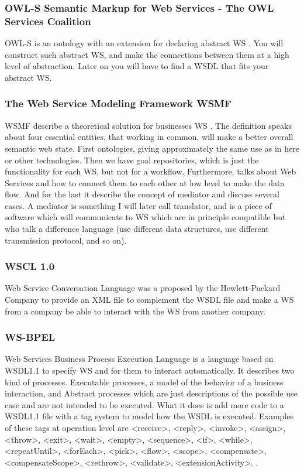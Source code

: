 \documentclass[a4paper,10pt]{article}
\begin{document}
    \subsubsection{OWL-S Semantic Markup for Web Services - The OWL Services Coalition}

    OWL-S is an ontology with an extension for declaring abstract WS \cite{owls} \cite{icec}. You will construct such abstract WS, and make the connections between them at a high level of abstraction. Later on you will have to find a WSDL that fits your abstract WS.

    \subsubsection{The Web Service Modeling Framework WSMF}

    WSMF describe a theoretical solution for businesses WS \cite{wsmf} \cite{icec}. The definition speaks about four essential entities, that working in common, will make a better overall semantic web state. First ontologies, giving approximately the same use as in here or other technologies. Then we have goal repositories, which is just the functionality for each WS, but not for a workflow. Furthermore, talks about Web Services and how to connect them to each other at low level to make the data flow. And for the last it describe the concept of mediator and discuss several cases. A mediator is something I will later call translator, and is a piece of software which will communicate to WS which are in principle compatible but who talk a difference language (use different data structures, use different transmission protocol, and so on).

    \subsubsection{WSCL 1.0}

    Web Service Conversation Language \cite{wscl} was a proposed by the Hewlett-Packard Company to provide an XML file to complement the WSDL file and make a WS from a company be able to interact with the WS from another company.

    \subsubsection{WS-BPEL}

    Web Services Business Process Execution Language is a language based on WSDL1.1 to specify WS and for them to interact automatically. It describes two kind of processes. Executable processes, a model of the behavior of a business interaction, and Abstract processes which are just descriptions of the possible use case and are not intended to be executed. What it does is add more code to a WSDL1.1 file with a tag system to model how the WSDL is executed. Examples of these tags at operation level are <receive>, <reply>, <invoke>, <assign>, <throw>, <exit>, <wait>, <empty>, <sequence>, <if>, <while>, <repeatUntil>, <forEach>, <pick>, <flow>, <scope>, <compensate>, <compensateScope>, <rethrow>, <validate>, <extensionActivity>. \cite{oasis}.
\end{document}

